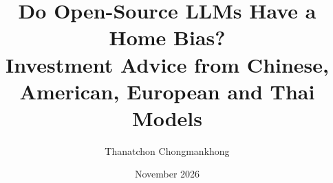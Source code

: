 \documentclass[11pt,a4paper]{article}
\begin{document}
\title{\bfseries Do Open-Source LLMs Have a Home Bias?\\[0.3ex]
  \large Investment Advice from Chinese, American, European and Thai Models}
\author{Thanatchon Chongmankhong}
\date{November 2026}

\maketitle
\thispagestyle{plain}








\appendix


\FloatBarrier


\end{document}
